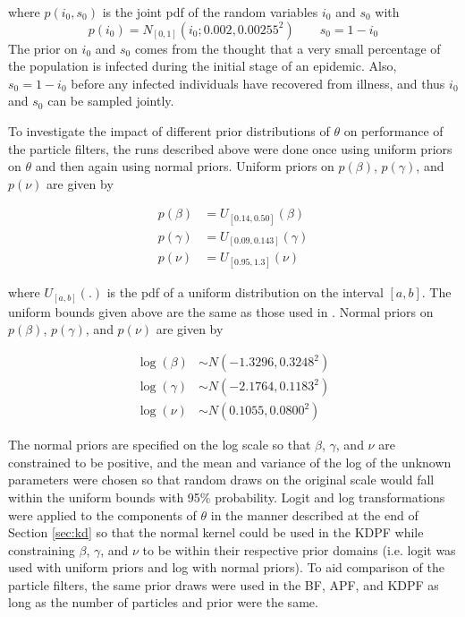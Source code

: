 \documentclass{elsarticle}
\begin{document}
\noindent where $p(i_0,s_0)$ is the joint pdf of the random variables $i_0$ and $s_0$ with
\[p\left(i_0\right) = N_{[0,1]}\left(i_0;0.002,0.00255^2\right) \qquad s_0 = 1 - i_0 \]
The prior on $i_0$ and $s_0$ comes from the thought that a very small percentage of the population is infected during the initial stage of an epidemic.  Also, $s_0 = 1 - i_0$ before any infected individuals have recovered from illness, and thus $i_0$ and $s_0$ can be sampled jointly.

To investigate the impact of different prior distributions of $\theta$ on performance of the particle filters, the runs described above were done once using uniform priors on $\theta$ and then again using normal priors.  Uniform priors on $p(\beta)$, $p(\gamma)$, and $p(\nu)$ are given by

\begin{align*}
p(\beta) &= U_{[0.14, 0.50]}(\beta) \\
p(\gamma) &= U_{[0.09, 0.143]}(\gamma) \\
p(\nu) &= U_{[0.95,1.3]}(\nu)
\end{align*}

\noindent where $U_{[a,b]}(.)$ is the pdf of a uniform distribution on the interval $[a,b]$.  The uniform bounds given above are the same as those used in \citet{skvortsov2012monitoring}.  Normal priors on $p(\beta)$, $p(\gamma)$, and $p(\nu)$ are given by

\begin{align*}
\log(\beta) &\sim  N(-1.3296, 0.3248^2) \\
\log(\gamma) &\sim N(-2.1764, 0.1183^2) \\
\log(\nu) &\sim N(0.1055, 0.0800^2)
\end{align*}

\noindent The normal priors are specified on the log scale so that $\beta$, $\gamma$, and $\nu$ are constrained to be positive, and the mean and variance of the log of the unknown parameters were chosen so that random draws on the original scale would fall within the uniform bounds with 95\% probability.  Logit and log transformations were applied to the components of $\theta$ in the manner described at the end of Section \ref{sec:kd} so that the normal kernel could be used in the KDPF while constraining $\beta$, $\gamma$, and $\nu$ to be within their respective prior domains (i.e. logit was used with uniform priors and log with normal priors).  To aid comparison of the particle filters, the same prior draws were used in the BF, APF, and KDPF as long as the number of particles and prior were the same.
\end{document}
